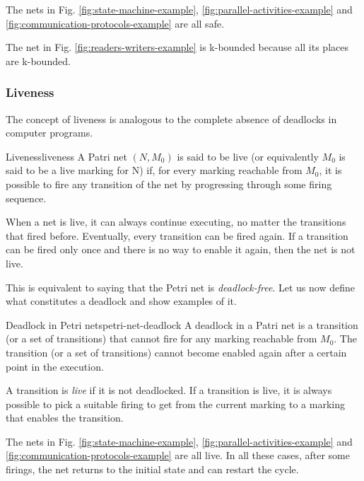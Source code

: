 The nets in Fig. \ref{fig:state-machine-example}, \ref{fig:parallel-activities-example}
and \ref{fig:communication-protocols-example} are all safe.

The net in Fig. \ref{fig:readers-writers-example}
is k-bounded because all its places are k-bounded.

\subsubsection{Liveness}

The concept of liveness is analogous to
the complete absence of deadlocks in computer programs.

\begin{definition}{Liveness}{liveness}
      A Patri net $(N, M_0)$ is said to be live
      (or equivalently $M_0$ is said to be a live marking for N) if,
      for every marking reachable from $M_0$, it is possible to fire any transition
      of the net by progressing through some firing sequence.
\end{definition}

When a net is live, it can always continue executing,
no matter the transitions that fired before.
Eventually, every transition can be fired again.
If a transition can be fired only once and there is no way to enable it again,
then the net is not live.

This is equivalent to saying that the Petri net is \emph{deadlock-free}.
Let us now define what constitutes a deadlock and show examples of it.

\begin{definition}{Deadlock in Petri nets}{petri-net-deadlock}
      A deadlock in a Patri net is a transition (or a set of transitions) that cannot fire
      for any marking reachable from $M_0$.
      The transition (or a set of transitions) cannot become enabled again
      after a certain point in the execution.
\end{definition}

A transition is \emph{live} if it is not deadlocked.
If a transition is live, it is always possible to pick a suitable firing
to get from the current marking to a marking that enables the transition.

The nets in Fig. \ref{fig:state-machine-example}, \ref{fig:parallel-activities-example}
and \ref{fig:communication-protocols-example} are all live.
In all these cases, after some firings,
the net returns to the initial state and can restart the cycle.

